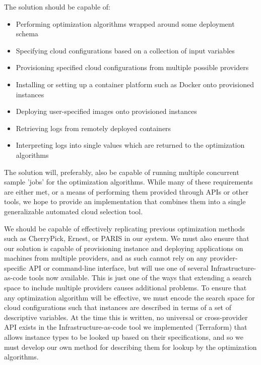 \documentclass{article}
\begin{document}
The solution should be capable of:
\begin{itemize}
\item Performing optimization algorithms wrapped around some deployment schema
\item Specifying cloud configurations based on a collection of input variables
\item Provisioning specified cloud configurations from multiple possible providers
\item Installing or setting up a container platform such as Docker onto provisioned instances
\item Deploying user-specified images onto provisioned instances
\item Retrieving logs from remotely deployed containers
\item Interpreting logs into single values which are returned to the optimization algorithms
\end{itemize}

The solution will, preferably, also be capable of running multiple concurrent sample 'jobs' for the optimization algorithms.
While many of these requirements are either met, or a means of performing them provided through APIs or other tools, we hope to provide an implementation that combines them into a single generalizable automated cloud selection tool. 


We should be capable of effectively replicating previous optimization methods such as CherryPick\cite{Alipourfard2017}, Ernest\cite{Venkataraman2016}, or PARIS\cite{Yadwadkar2017} in our system. We must also ensure that our solution is capable of provisioning instance and deploying applications on machines from multiple providers, and as such cannot rely on any provider-specific API or command-line interface, but will use one of several Infrastructure-as-code tools now available. This is just one of the ways that extending a search space to include multiple providers causes additional problems. To ensure that any optimization algorithm will be effective, we must encode the search space for cloud configurations such that instances are described in terms of a set of descriptive variables. At the time this is written, no universal or cross-provider API exists in the Infrastructure-as-code tool we implemented (Terraform) that allows instance types to be looked up based on their specifications, and so we must develop our own method for describing them for lookup by the optimization algorithms.  
\end{document}
